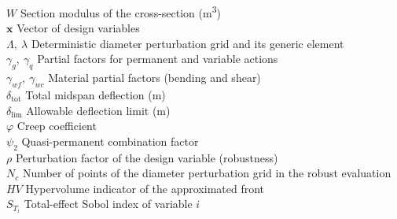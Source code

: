 \begin{tabbing}
$W$ \> Section modulus of the cross-section (m\textsuperscript{3})\\
$\mathbf{x}$ \> Vector of design variables\\
$\Lambda,\ \lambda$ \> Deterministic diameter perturbation grid and its generic element\\
$\gamma_g,\ \gamma_q$ \> Partial factors for permanent and variable actions\\
$\gamma_{wf},\ \gamma_{wc}$ \> Material partial factors (bending and shear)\\
$\delta_{\mathrm{tot}}$ \> Total midspan deflection (m)\\
$\delta_{\mathrm{lim}}$ \> Allowable deflection limit (m)\\
$\varphi$ \> Creep coefficient\\
$\psi_2$ \> Quasi-permanent combination factor\\
$\rho$ \> Perturbation factor of the design variable (robustness)\\
$N_c$ \> Number of points of the diameter perturbation grid in the robust evaluation\\
$HV$ \> Hypervolume indicator of the approximated front\\
$S_{T_i}$ \> Total-effect Sobol index of variable $i$
\end{tabbing}
